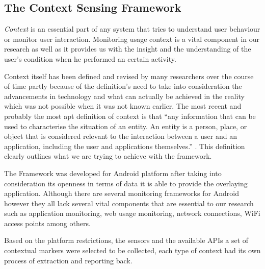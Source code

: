 \documentclass[prodmode,acmtecs]{acmsmall}
\begin{document}
\subsection{The Context Sensing Framework}
\label{csf}

\textit{Context} is an essential part of any system that tries to understand user behaviour or monitor user interaction. Monitoring usage context is a vital component in our research as well as it provides us with the insight and the understanding of the user's condition when he performed an certain activity.

Context itself has been defined and revised by many researchers over the course of time partly because of the definition's need to take into consideration the advancements in technology and what can actually be achieved in the reality which was not possible when it was not known earlier. The most recent and probably the most apt definition of context is that ``any information that can be used to characterise the situation of an entity. An entity is a person, place, or object that is considered relevant to the interaction between a user and an application, including the user and applications themselves.'' \cite{dey2001understanding}. This definition clearly outlines what we are trying to achieve with the framework.

The Framework was developed for Android platform after taking into consideration its openness in terms of data it is able to provide the overlaying application. Although there are several monitoring frameworks for Android \cite{lathia2013smartphones,novakextensible2013} however they all lack several vital components that are essential to our research such as application monitoring, web usage monitoring, network connections, WiFi access points among others.

Based on the platform restrictions, the sensors and the available APIs a set of contextual markers were selected to be collected, each type of context had its own process of extraction and reporting back.
\end{document}
